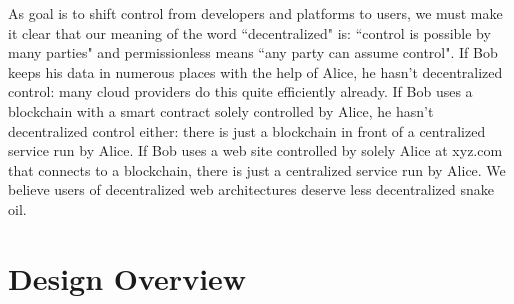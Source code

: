 \documentclass[journal]{IEEEtran}
\begin{document}
As goal is to shift control from developers and platforms to users, we must make it clear that our meaning of the word ``decentralized" is: ``control is possible by many parties" and permissionless means ``any party can assume control".  If Bob keeps his data in numerous places with the help of Alice, he hasn't decentralized control: many cloud providers do this quite efficiently already.  If Bob uses a blockchain with a smart contract solely controlled by Alice, he hasn't decentralized control either: there is just a blockchain in front of a centralized service run by Alice.  If Bob uses a web site controlled by solely Alice at xyz.com that connects to a blockchain, there is just a centralized service run by Alice.  We believe users of decentralized web architectures deserve less decentralized snake oil.

\section{Design Overview}
\end{document}
